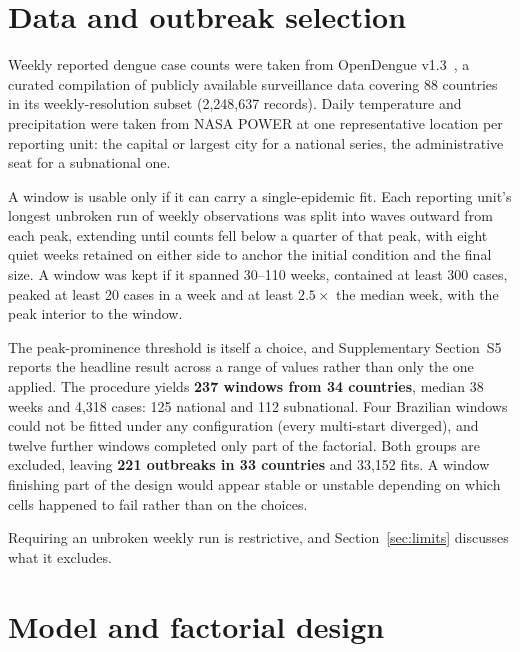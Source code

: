\documentclass[11pt,a4paper]{article}
\begin{document}
\section{Data and outbreak selection}

Weekly reported dengue case counts were taken from OpenDengue
v1.3~\cite{opendengue}, a curated compilation of publicly available surveillance
data covering 88 countries in its weekly-resolution subset (2{,}248{,}637
records). Daily temperature and precipitation were taken from NASA POWER at one
representative location per reporting unit: the capital or largest city for a
national series, the administrative seat for a subnational one.

A window is usable only if it can carry a single-epidemic fit. Each reporting
unit's longest unbroken run of weekly observations was split into waves outward
from each peak, extending until counts fell below a quarter of that peak, with
eight quiet weeks retained on either side to anchor the initial condition and the
final size. A window was kept if it spanned 30--110 weeks, contained at least 300
cases, peaked at least 20 cases in a week and at least $2.5\times$ the median
week, with the peak interior to the window.

The peak-prominence threshold is itself a choice, and Supplementary Section~S5
reports the headline result across a range of values rather than only the one
applied. The procedure yields \textbf{237 windows from 34 countries}, median 38
weeks and 4{,}318 cases: 125 national and 112 subnational. Four Brazilian windows
could not be fitted under any configuration (every multi-start diverged), and
twelve further windows completed only part of the factorial. Both groups are
excluded, leaving \textbf{221 outbreaks in 33 countries} and 33{,}152 fits. A
window finishing part of the design would appear stable or unstable depending on
which cells happened to fail rather than on the choices.

Requiring an unbroken weekly run is restrictive, and Section~\ref{sec:limits}
discusses what it excludes.

\section{Model and factorial design}
\end{document}
